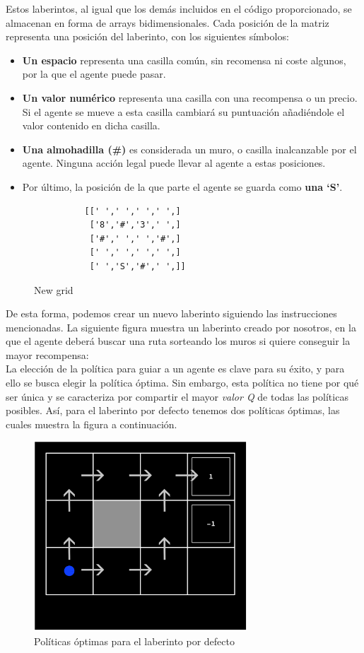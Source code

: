 \documentclass[12pt]{article}
\begin{document}
Estos laberintos, al igual que los demás incluidos en el código proporcionado, se almacenan en forma de arrays bidimensionales. Cada posición de la matriz representa una posición del laberinto, con los siguientes símbolos:
\begin{itemize}
    \item \textbf{Un espacio} representa una casilla común, sin recomensa ni coste algunos, por la que el agente puede pasar.
    \item \textbf{Un valor numérico} representa una casilla con una recompensa o un precio. Si el agente se mueve a esta casilla cambiará su puntuación añadiéndole el valor contenido en dicha casilla.
    \item \textbf{Una almohadilla (\#)} es considerada un muro, o casilla inalcanzable por el agente. Ninguna acción legal puede llevar al agente a estas posiciones.
    \item Por último, la posición de la que parte el agente se guarda como \textbf{una `S'}.
\end{itemize}

\newpage
\begin{figure}
    \begin{verbatim}
          [[' ',' ',' ',' ',]
           ['8','#','3',' ',]
           ['#',' ',' ','#',]
           [' ',' ',' ',' ',]
           [' ','S','#',' ',]]
    \end{verbatim}
    \vspace{-20pt}
    \caption{New grid}
    \vspace{-10pt}
\end{figure}
De esta forma, podemos crear un nuevo laberinto siguiendo las instrucciones mencionadas. La siguiente figura muestra un laberinto creado por nosotros, en la que el agente deberá buscar una ruta sorteando los muros si quiere conseguir la mayor recompensa:\\[1em]

La elección de la política para guiar a un agente es clave para su éxito, y para ello se busca elegir la política óptima. Sin embargo, esta política no tiene por qué ser única y se caracteriza por compartir el mayor \textit{valor Q} de todas las políticas posibles. Así, para el laberinto por defecto tenemos dos políticas óptimas, las cuales muestra la figura a continuación.

\begin{figure}[h]
    \centering
    \includegraphics[width=8cm]{policies}
    \caption{Políticas óptimas para el laberinto por defecto}
\end{figure}
\end{document}
